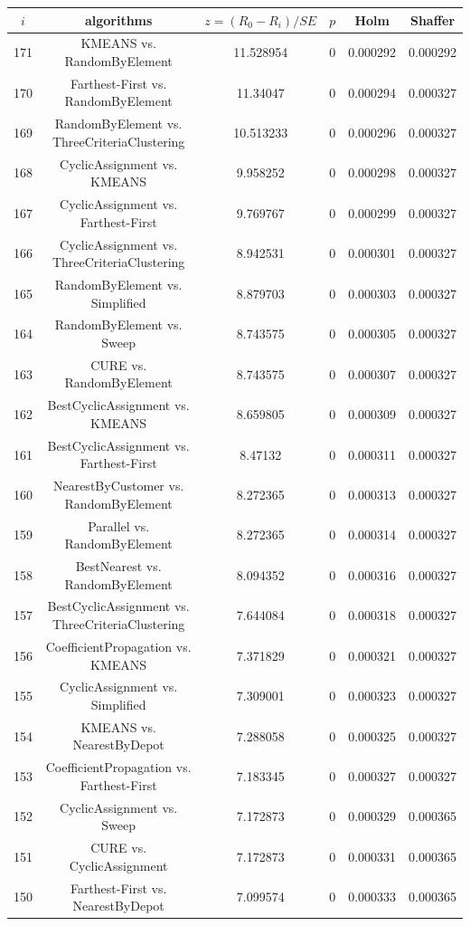 \documentclass[a4paper,10pt]{article}
\begin{document}
\begin{landscape}
\begin{table}[!htp]
\centering\scriptsize
\begin{tabular}{cccccc}
$i$&algorithms&$z=(R_0 - R_i)/SE$&$p$&Holm&Shaffer\\
\hline171&KMEANS vs. RandomByElement&11.528954&0&0.000292&0.000292\\
170&Farthest-First vs. RandomByElement&11.34047&0&0.000294&0.000327\\
169&RandomByElement vs. ThreeCriteriaClustering&10.513233&0&0.000296&0.000327\\
168&CyclicAssignment vs. KMEANS&9.958252&0&0.000298&0.000327\\
167&CyclicAssignment vs. Farthest-First&9.769767&0&0.000299&0.000327\\
166&CyclicAssignment vs. ThreeCriteriaClustering&8.942531&0&0.000301&0.000327\\
165&RandomByElement vs. Simplified&8.879703&0&0.000303&0.000327\\
164&RandomByElement vs. Sweep&8.743575&0&0.000305&0.000327\\
163&CURE vs. RandomByElement&8.743575&0&0.000307&0.000327\\
162&BestCyclicAssignment vs. KMEANS&8.659805&0&0.000309&0.000327\\
161&BestCyclicAssignment vs. Farthest-First&8.47132&0&0.000311&0.000327\\
160&NearestByCustomer vs. RandomByElement&8.272365&0&0.000313&0.000327\\
159&Parallel vs. RandomByElement&8.272365&0&0.000314&0.000327\\
158&BestNearest vs. RandomByElement&8.094352&0&0.000316&0.000327\\
157&BestCyclicAssignment vs. ThreeCriteriaClustering&7.644084&0&0.000318&0.000327\\
156&CoefficientPropagation vs. KMEANS&7.371829&0&0.000321&0.000327\\
155&CyclicAssignment vs. Simplified&7.309001&0&0.000323&0.000327\\
154&KMEANS vs. NearestByDepot&7.288058&0&0.000325&0.000327\\
153&CoefficientPropagation vs. Farthest-First&7.183345&0&0.000327&0.000327\\
152&CyclicAssignment vs. Sweep&7.172873&0&0.000329&0.000365\\
151&CURE vs. CyclicAssignment&7.172873&0&0.000331&0.000365\\
150&Farthest-First vs. NearestByDepot&7.099574&0&0.000333&0.000365\\

\end{tabular}
\end{table}
\end{landscape}
\end{document}
